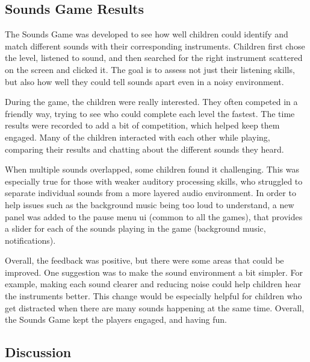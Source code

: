 % 




\newpage
\subsection{Sounds Game Results}

The Sounds Game was developed to see how well children could identify and match different sounds with their corresponding instruments. Children first chose the level, listened to sound, and then searched for the right instrument scattered on the screen and clicked it. The goal is to assess not just their listening skills, but also how well they could tell sounds apart even in a noisy environment.

During the game, the children were really interested. They often competed in a friendly way, trying to see who could complete each level the fastest. The time results were recorded to add a bit of competition, which helped keep them engaged. Many of the children interacted with each other while playing, comparing their results and chatting about the different sounds they heard.

 When multiple sounds overlapped, some children found it challenging. This was especially true for those with weaker auditory processing skills, who struggled to separate individual sounds from a more layered audio environment. In order to help issues such as the background music being too loud to understand, a new panel was added to the pause menu \gls{ui} (common to all the games), that provides a slider for each of the sounds playing in the game (background music, notifications).

Overall, the feedback was positive, but there were some areas that could be improved. One suggestion was to make the sound environment a bit simpler. For example, making each sound clearer and reducing noise could help children hear the instruments better. This change would be especially helpful for children who get distracted when there are many sounds happening at the same time. Overall, the Sounds Game kept the players engaged, and having fun.


\newpage
\subsection{Discussion}

